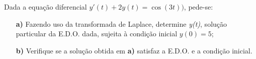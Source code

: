 \linespread{1.5}
Dada a equação diferencial $y'(t) + 2y(t) = \cos{(3t)})$, pede-se:
\begin{itemize}
    \item[\textbf{a)}] Fazendo uso da transformada de Laplace, determine \textit{y(t)}, solução particular da E.D.O. dada, sujeita à condição inicial $y(0) = 5$;
    \item[\textbf{b)}] Verifique se a solução obtida em \textbf{a)} satisfaz a E.D.O. e a condição inicial.
\end{itemize}